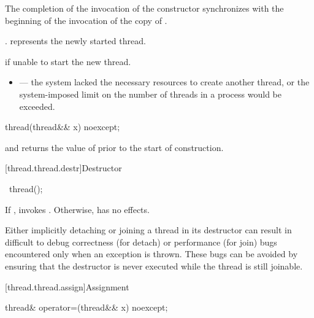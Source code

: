 \begin{itemdescr}
\pnum
\sync
The completion of the invocation of the constructor
synchronizes with the beginning of the invocation of the copy of .

\pnum
\ensures
{}.  represents the newly started thread.

\pnum
\throws
{} if unable to start the new thread.

\pnum
\errors
\begin{itemize}
\item {} --- the system lacked the necessary
resources to create another thread, or the system-imposed limit on the number of
threads in a process would be exceeded.
\end{itemize}
\end{itemdescr}

%
\begin{itemdecl}
thread(thread&& x) noexcept;
\end{itemdecl}

\begin{itemdescr}
\pnum
\ensures
{} and  returns the
value of  prior to the start of construction.
\end{itemdescr}

[thread.thread.destr]{Destructor}

%
\begin{itemdecl}
~thread();
\end{itemdecl}

\begin{itemdescr}
\pnum
\effects
If , invokes .
Otherwise, has no effects.
\begin{note}
Either implicitly detaching or joining a  thread in its
destructor can result in difficult to debug correctness (for detach) or performance
(for join) bugs encountered only when an exception is thrown.
These bugs can be avoided by ensuring that
the destructor is never executed while the thread is still joinable.
\end{note}
\end{itemdescr}

[thread.thread.assign]{Assignment}

%
\begin{itemdecl}
thread& operator=(thread&& x) noexcept;
\end{itemdecl}


